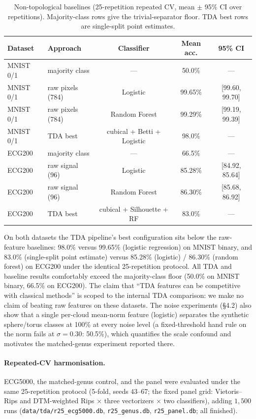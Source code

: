\documentclass[12pt, a4paper]{report}
\theoremstyle{definition}
\theoremstyle{plain}
\theoremstyle{remark}
\begin{document}
\begin{table}[H]
  \centering
  \caption{Non-topological baselines (25-repetition repeated CV, mean
  $\pm$ 95\% CI over repetitions). Majority-class rows give the
  trivial-separator floor. TDA best rows are single-split point estimates.}
  \label{tab:baselines}
  \small
  \begin{tabular}{llccc}
    \toprule
    Dataset & Approach & Classifier & Mean acc. & 95\% CI \\
    \midrule
    MNIST 0/1 & majority class & --- & 50.0\% & --- \\
    MNIST 0/1 & raw pixels (784) & Logistic & 99.65\% & [99.60, 99.70] \\
    MNIST 0/1 & raw pixels (784) & Random Forest & 99.29\% & [99.19, 99.39] \\
    MNIST 0/1 & TDA best & cubical + Betti + Logistic & 98.0\% & --- \\
    ECG200 & majority class & --- & 66.5\% & --- \\
    ECG200 & raw signal (96) & Logistic & 85.28\% & [84.92, 85.64] \\
    ECG200 & raw signal (96) & Random Forest & 86.30\% & [85.68, 86.92] \\
    ECG200 & TDA best & cubical + Silhouette + RF & 83.0\% & --- \\
    \bottomrule
  \end{tabular}
\end{table}

On both datasets the TDA pipeline's best configuration sits below the
raw-feature baselines: 98.0\% versus 99.65\% (logistic regression)
on MNIST binary, and 83.0\% (single-split point estimate) versus
85.28\% (logistic) / 86.30\% (random forest) on ECG200 under the
identical 25-repetition protocol.
All TDA and baseline results comfortably exceed the majority-class
floor (50.0\% on MNIST binary, 66.5\% on ECG200). The claim that
``TDA features can be competitive with classical methods'' is
scoped to the internal TDA comparison: we make no claim of
beating raw features on these datasets. The noise experiments
(\S4.2) also show that a single per-cloud mean-norm feature
(logistic) separates the synthetic sphere/torus classes at 100\% at
every noise level (a fixed-threshold hand rule on the norm fails at
$\sigma{=}0.30$: 50.5\%), which
quantifies the scale confound and motivates the matched-genus
experiment reported there.

\paragraph{Repeated-CV harmonisation.} ECG5000,
the matched-genus control, and the panel were evaluated under the same 25-repetition protocol
(5-fold, seeds 43--67; the fixed panel grid:
Vietoris--Rips and DTM-weighted Rips $\times$ three vectorizers
$\times$ two classifiers), adding $1{,}500$ runs
(\texttt{data/tda/r25\_ecg5000.db}, \texttt{r25\_genus.db},
\texttt{r25\_panel.db}; all finished).
\end{document}
